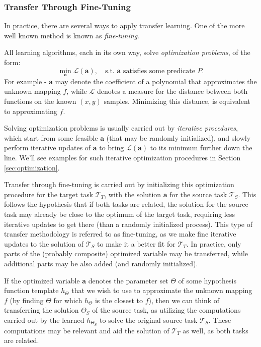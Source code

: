 \documentclass{article}
\begin{document}
\subsubsection{Transfer Through Fine-Tuning}

\medskip
\noindent
In practice, there are several ways to apply transfer learning. One of the more well known method is known as \emph{fine-tuning}.

\medskip
\noindent
All learning algorithms, each in its own way, solve \emph{optimization problems}, of the form:
\begin{equation*}
    \min_{\mathbf{a}}{\mathcal{L}(\mathbf{a})}, \quad \text{s.t. $\mathbf{a}$ satisfies some predicate $P$}.
\end{equation*}
For example - $\mathbf{a}$ may denote the coefficient of a polynomial that approximates the unknown mapping $f$, while $\mathcal{L}$ denotes a measure for the distance between both functions on the known $(x,y)$ samples. Minimizing this distance, is equivalent to approximating $f$.

\medskip
\noindent
Solving optimization problems is usually carried out by \emph{iterative procedures}, which start from some feasible $\mathbf{a}$ (that may be randomly initialized), and slowly perform iterative updates of $\mathbf{a}$ to bring $\mathcal{L}(\mathbf{a})$ to its minimum further down the line. We'll see examples for such iterative optimization procedures in Section \ref{sec:optimization}.

\medskip
\noindent
Transfer through fine-tuning is carried out by initializing this optimization procedure for the target task $\mathcal{T}_T$, with the solution $\mathbf{a}$ for the source task $\mathcal{T}_S$. This follows the hypothesis that if both tasks are related, the solution for the source task may already be close to the optimum of the target task, requiring less iterative updates to get there (than a randomly initialized process). This type of transfer methodology is referred to as fine-tuning, as we make fine iterative updates to the solution of $\mathcal{T}_S$ to make it a better fit for $\mathcal{T}_T$. In practice, only parts of the (probably composite) optimized variable may be transferred, while additional parts may be also added (and randomly initialized).

\medskip
\noindent
If the optimized variable $\mathbf{a}$ denotes the parameter set $\Theta$ of some hypothesis function template $h_{\Theta}$ that we wish to use to approximate the unknown mapping $f$ (by finding $\Theta$ for which $h_\Theta$ is the closest to $f$), then we can think of transferring the solution $\Theta_S$ of the source task, as utilizing the computations carried out by the learned $h_{\Theta_S}$ to solve the original source task $\mathcal{T}_S$. These computations may be relevant and aid the solution of $\mathcal{T}_T$ as well, as both tasks are related.
\end{document}
